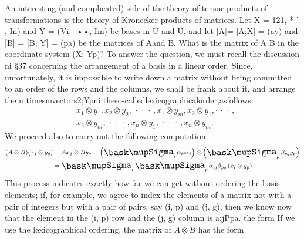 An interesting (and complicated) side of the theory of tensor products of
transformations is the theory of Kronecker products of matrices. Let X = 121, *
' , In) and Y = (Vi, -••, Im) be bases in U and U, and let [A]= [A;X] = (ay) and
[B] = [B; Y] = (pa) be the matrices of Aand B. What is the matrix of A  B in
the coordinate system (X; Yp)? To answer the question, we must recall the
discussion ni §37 concerning the arrangement of a basis in a linear order.
Since, unfortunately, it is impossible to write down a matrix without being
committed to an order of the rows and the columns, we shall be frank about it,
and arrange the n timesmvectors2;Ypni
theso-calledlexicographicalorder,asfollows:
\begin{align*}
    & x_1 \otimes y_1, x_2 \otimes y_2,\,\cdot\,\cdot\,\cdot\,, x_1 \otimes y_m, x_2 \otimes y_1, \cdot\,\cdot\,\cdot\,,\\
    & x_2 \otimes y_m, \,\cdot\,\cdot\,\cdot\,, x_n \otimes y_1, \,\cdot\,\cdot\,\cdot\,, x_n \otimes y_m.
\end{align*}
We proceed also to carry out the following computation:
\begin{align*}
    (A \otimes B)(x_j \otimes y_q) & = Ax_j \otimes By_q = \left(\sumx_i \alpha_{ij}x_i\right) \otimes \left(\sumx_p \beta_{pq}y_p\right)\\
    &= \sumx_i \sumx_p \alpha_{ij}\beta_{pq} \left(x_i \otimes y_p\right).
\end{align*}
This process indicates exactly how far we can get without ordering the basis elements; if, for example, we agree to index the elements of a matrix not with a pair of integers but with a pair of pairs, say (i, p) and (j, g), then we know now that the element in the (i, p) row and the (j, g) column
is a;jPpa. the form
If we use the lexicographical ordering, the matrix of \(A \otimes B\) has
the form

